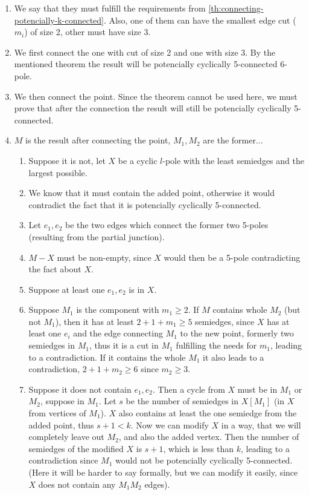 \documentclass[12pt, twoside]{book}
\begin{document}
\begin{enumerate}
	\item We say that they must fulfill the requirements from \cref{th:connecting-potencially-k-connected}. Also, one of them can have the smallest edge cut ($m_i$) of size 2, other must have size 3.
	\item We first connect the one with cut of size 2 and one with size 3. By the mentioned theorem the result will be potencially cyclically 5-connected 6-pole.
	\item We then connect the point. Since the theorem cannot be used here, we must prove that after the connection the result will still be potencially cyclically 5-connected. 
	\item $M$ is the result after connecting the point, $M_1,M_2$ are the former...
	\begin{enumerate}
		\item Suppose it is not, let $X$ be a cyclic $l$-pole with the least semiedges and the largest possible.
		\item We know that it must contain the added point, otherwise it would contradict the fact that it is potencially cyclically 5-connected.
		\item Let $e_1,e_2$ be the two edges which connect the former two 5-poles (resulting from the partial junction).
		\item $M-X$ must be non-empty, since $X$ would then be a 5-pole contradicting the fact about $X$.
		\item Suppose at least one $e_1,e_2$ is in $X$.
		\item Suppose $M_1$ is the component with $m_1\geq 2$. If $M$ contains whole $M_2$ (but not $M_1$), then it has at least $2+1+m_1\geq 5$ semiedges, since $X$ has at least one $e_i$ and the edge connecting $M_1$ to the new point, formerly two semiedges in $M_1$, thus it is a cut in $M_1$ fulfilling the needs for $m_1$, leading to a contradiction. If it contains the whole $M_1$ it also leads to a contradiction, $2+1+m_2\geq 6$ since $m_2\geq 3$. 
		\item Suppose it does not contain $e_1,e_2$. Then a cycle from $X$ must be in $M_1$ or $M_2$, suppose in $M_1$. Let $s$ be the number of semiedges in $X[M_1]$ (in $X$ from vertices of $M_1$). $X$ also contains at least the one semiedge from the added point, thus $s+1<k$. Now we can modify $X$ in a way, that we will completely leave out $M_2$, and also the added vertex. Then the number of semiedges of the modified $X$ is $s+1$, which is less than $k$, leading to a contradiction since $M_1$ would not be potencially cyclically 5-connected. (Here it will be harder to say formally, but we can modify it easily, since $X$ does not contain any $M_1M_2$ edges).

\end{enumerate}
\end{enumerate}
\end{document}
